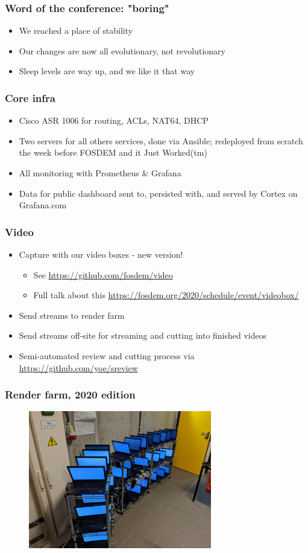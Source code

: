 \documentclass[aspectratio=169]{beamer}
\begin{document}
\begin{frame}
	\frametitle{Word of the conference: "boring"}
	\vfill
	\begin{itemize}
		\item We reached a place of stability
		\item Our changes are now all evolutionary, not revolutionary
		\item Sleep levels are way up, and we like it that way
	\end{itemize}
	\vfill
\end{frame}

\begin{frame}
	\frametitle{Core infra}
	\vfill
	\begin{itemize}
		\item Cisco ASR 1006 for routing, ACLs, NAT64, DHCP
		\item Two servers for all others services, done via Ansible; redeployed from scratch the week before FOSDEM and it Just Worked(tm)
		\item All monitoring with Prometheus \& Grafana
		\item Data for public dashboard sent to, persisted with, and served by Cortex on Grafana.com
	\end{itemize}
	\vfill
\end{frame}

\begin{frame}
	\frametitle{Video}
	\vfill
	\begin{itemize}
		\item Capture with our video boxes - new version!
		\begin{itemize}
			\item See \url{https://github.com/fosdem/video}
			\item Full talk about this \url{https://fosdem.org/2020/schedule/event/videobox/}
		\end{itemize}
		\item Send streams to render farm
		\item Send streams off-site for streaming and cutting into finished videos
		\item Semi-automated review and cutting process via \url{https://github.com/yoe/sreview}
	\end{itemize}
	\vfill
\end{frame}

\begin{frame}
	\frametitle{Render farm, 2020 edition}
	\vfill
	\begin{figure}[ht!]
		\includegraphics[width=80mm]{render_farm.jpg}
	\end{figure}
	\vfill
\end{frame}
\end{document}
